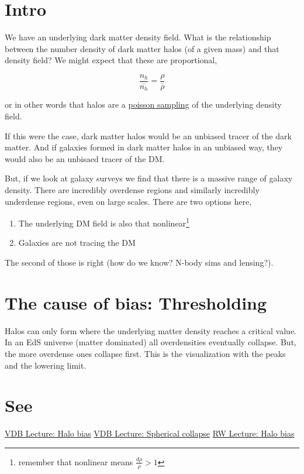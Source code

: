 \documentclass{article}
\begin{document}
\section{Intro}

We have an underlying dark matter density field. What is the relationship between the number density of dark matter halos (of a given mass) and that density field?
We might expect that these are proportional,

\begin{equation}
    \frac{n_h}{\bar{n_h}} = \frac{\rho}{\bar{\rho}}
\end{equation}

\noindent or in other words that halos are a \href{https://en.wikipedia.org/wiki/Poisson_sampling}{poisson sampling} of the underlying density field.

If this were the case, dark matter halos would be an unbiased tracer of the dark matter. And if galaxies formed in dark matter halos in an unbiased way, they would also be an unbisaed tracer of the DM\@.

But, if we look at galaxy surveys we find that there is a massive range of galaxy density. There are incredibly overdense regions and similarly incredibly underdense regions, even on large scales.
There are two options here,
\begin{enumerate}
    \item The underlying DM field is also that nonlinear\footnote{remember that nonlinear means $\frac{d\rho}{\rho} > 1$}
    \item Galaxies are not tracing the DM
\end{enumerate}

The second of those is right (how do we know? N-body sims and lensing?).

\section{The cause of bias: Thresholding}

Halos can only form where the underlying matter density reaches a critical value.
In an EdS universe (matter dominated) all overdensities eventually collapse.
But, the more overdense ones collapse first.
This is the visualization with the peaks and the lowering limit.





\section{See}

\href{http://www.astro.yale.edu/vdbosch/astro610_lecture10.pdf}{VDB Lecture: Halo bias}
\href{http://www.astro.yale.edu/vdbosch/astro610_lecture8.pdf}{VDB Lecture: Spherical collapse}
\href{http://risa.stanford.edu/teaching/463/Lecture8.463.pdf}{RW Lecture: Halo bias}
\end{document}
